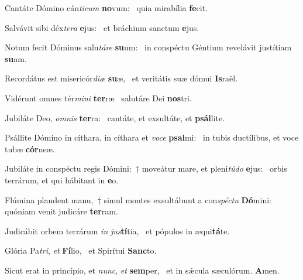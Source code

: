\item Cantáte Dómino cán\textit{ticum} \textbf{no}vum:~\psstar{} quia mirabília \textbf{fe}cit.
\item Salvávit sibi déx\textit{tera} \textbf{e}jus:~\psstar{} et bráchium sanctum \textbf{e}jus.
\item Notum fecit Dóminus salu\textit{táre} \textbf{su}um:~\psstar{} in conspéctu Géntium revelávit justítiam \textbf{su}am.
\item Recordátus est misericór\textit{diæ} \textbf{su}æ,~\psstar{} et veritátis suæ dómui \textbf{Is}raël.
\item Vidérunt omnes tér\textit{mini} \textbf{ter}ræ~\psstar{} salutáre Dei \textbf{nos}tri.
\item Jubiláte Deo, \textit{omnis} \textbf{ter}ra:~\psstar{} cantáte, et exsultáte, et \textbf{psál}lite.
\item Psállite Dómino in cíthara, in cíthara et \textit{voce} \textbf{psal}mi:~\psstar{} in tubis ductílibus, et voce tubæ \textbf{cór}neæ.
\item Jubiláte in conspéctu regis Dómini:~† moveátur mare, et pleni\textit{túdo} \textbf{e}jus:~\psstar{} orbis terrárum, et qui hábitant in \textbf{e}o.
\item Flúmina plaudent manu,~† simul montes exsultábunt a con\textit{spéctu} \textbf{Dó}mini:~\psstar{} quóniam venit judicáre \textbf{ter}ram.
\item Judicábit orbem terrárum \textit{in} \textit{jus}\textbf{tí}tia,~\psstar{} et pópulos in æqui\textbf{tá}te.
\item Glória Pa\textit{tri}, \textit{et} \textbf{Fí}lio,~\psstar{} et Spirítui \textbf{Sanc}to.
\item Sicut erat in princípio, et \textit{nunc}, \textit{et} \textbf{sem}per,~\psstar{} et in sǽcula sæculórum. \textbf{A}men.